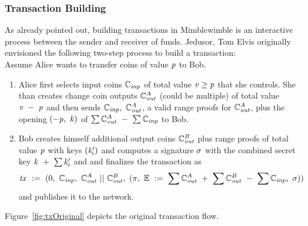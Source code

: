 \subsubsection{Transaction Building}
As already pointed out, building transactions in Mimblewimble is an interactive process between the sender and receiver of funds. Jedusor, Tom Elvis originally envisioned the following two-step process
to build a transaction:~\cite{jedusor2016mimblewimble}\\
Assume Alice wants to transfer coins of value $\mathit{p}$ to Bob.
\begin{enumerate}
    \item Alice first selects input coins $\mathbb{C}_{\mathit{inp}}$ of total value $\mathit{v} \geq \mathit{p}$ that she controls. She than creates change coin outputs $\mathbb{C}_{\mathit{out}}^{A}$ (could be multiple) of total value $\mathit{v} ~-~ \mathit{p}$ and then
    sends $\mathbb{C}_{\mathit{inp}} ,~ \mathbb{C}_{\mathit{out}}^{A}$, a valid range proofs for $\mathbb{C}_{\mathit{out}}^{A}$, plus the opening $(-\mathit{p} ,~ \mathit{k})$ of $\sum{\mathbb{C}_{\mathit{out}}^{A}} ~-~ \sum{\mathbb{C}_{\mathit{inp}}}$ to Bob.
    \item Bob creates himself additional output coins $\mathbb{C}_{\mathit{out}}^B$ plus range proofs of total value $\mathit{p}$ with keys $(\mathit{k}'_i)$ and computes a signature $\sigma$ with the combined secret key $\mathit{k} ~+~ \sum{\mathit{k}'_i}$ and
    and finalizes the transaction as
    \[ \mathit{tx} ~:=~ (0 ,~ \mathbb{C}_{\mathit{inp}} ,~ \mathbb{C}_{\mathit{out}}^A ~||~ \mathbb{C}_{\mathit{out}}^B ,~ (\pi ,~ \mathbb{E} ~:=~ \sum{\mathbb{C}_{\mathit{out}}^A} ~+~ \sum{\mathbb{C}_{\mathit{out}}^B} ~-~ \sum{\mathbb{C}_{\mathit{inp}}} ,~ \sigma)) \]
    and publishes it to the network.
\end{enumerate}
Figure~\ref{fig:txOriginal} depicts the original transaction flow.\\
